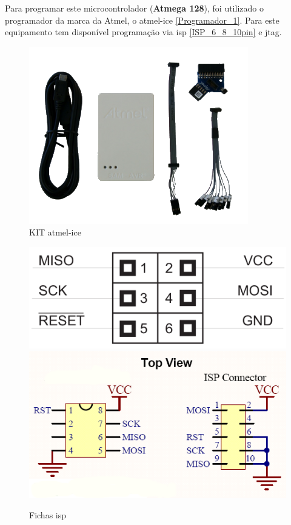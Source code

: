 Para programar este microcontrolador (\textbf{Atmega 128}), foi utilizado o programador da marca da Atmel, o \ac{atmel-ice} \autoref{Programador_1}. Para este equipamento tem disponível programação via \ac{isp} \autoref{ISP_6_8_10pin} e \ac{jtag}.\\
\begin{minipage}[!b]{.5\linewidth}
	\begin{figure}[H]
		\captionsetup{justification=raggedright,singlelinecheck=false}
		\flushleft
		\includegraphics[scale=0.65]{./image/PESTA/programador/Atmel_ice.png}
		\caption{KIT \acs{atmel-ice}}
		\label{Programador_1}
	\end{figure}
\end{minipage}
\hspace{.5cm}
\begin{minipage}[!b]{.5\linewidth}
	\begin{figure}[H]
		\captionsetup{justification=raggedright,singlelinecheck=false}
		\flushleft
		\includegraphics[scale=0.35]{./image/PESTA/programador/isp_6pin.png}
		\includegraphics[scale=0.5]{./image/PESTA/programador/isp_8e10pin.png}
		\caption{Fichas \acs{isp}}
		\label{ISP_6_8_10pin}
	\end{figure}
\end{minipage}
\newpage
